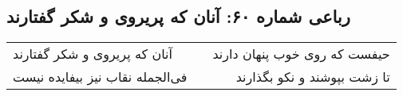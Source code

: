 \begin{center}
\section*{رباعی شماره ۶۰: آنان که پریروی و شکر گفتارند}
\label{sec:060}
\begin{longtable}{l p{0.5cm} r}
آنان که پریروی و شکر گفتارند
&&
حیفست که روی خوب پنهان دارند
\\
فی‌الجمله نقاب نیز بیفایده نیست
&&
تا زشت بپوشند و نکو بگذارند
\\
\end{longtable}
\end{center}
